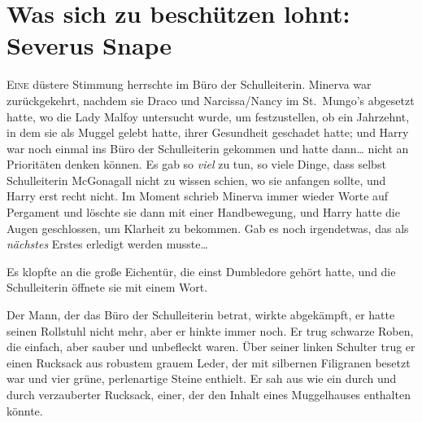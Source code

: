 \chapter{Was sich zu beschützen lohnt: Severus Snape}

\lettrine{E}{ine} düstere Stimmung herrschte im Büro der Schulleiterin. Minerva war zurückgekehrt, nachdem sie Draco und Narcissa/Nancy im St.~Mungo’s abgesetzt hatte, wo die Lady Malfoy untersucht wurde, um festzustellen, ob ein Jahrzehnt, in dem sie als Muggel gelebt hatte, ihrer Gesundheit geschadet hatte; und Harry war noch einmal ins Büro der Schulleiterin gekommen und hatte dann… nicht an Prioritäten denken können. Es gab so \emph{viel} zu tun, so viele Dinge, dass selbst Schulleiterin McGonagall nicht zu wissen schien, wo sie anfangen sollte, und Harry erst recht nicht. Im Moment schrieb Minerva immer wieder Worte auf Pergament und löschte sie dann mit einer Handbewegung, und Harry hatte die Augen geschlossen, um Klarheit zu bekommen.
Gab es noch irgendetwas, das als \emph{nächstes} Erstes erledigt werden musste…

Es klopfte an die große Eichentür, die einst Dumbledore gehört hatte, und die Schulleiterin öffnete sie mit einem Wort.

Der Mann, der das Büro der Schulleiterin betrat, wirkte abgekämpft, er hatte seinen Rollstuhl nicht mehr, aber er hinkte immer noch. Er trug schwarze Roben, die einfach, aber sauber und unbefleckt waren. Über seiner linken Schulter trug er einen Rucksack aus robustem grauem Leder, der mit silbernen Filigranen besetzt war und vier grüne, perlenartige Steine enthielt. Er sah aus wie ein durch und durch verzauberter Rucksack, einer, der den Inhalt eines Muggelhauses enthalten könnte.


